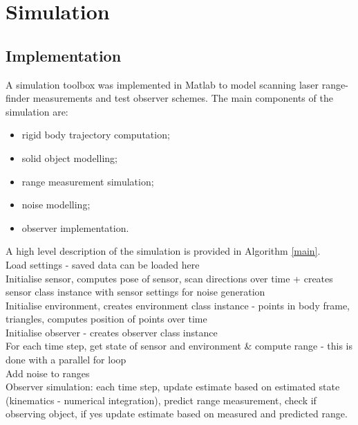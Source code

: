 \chapter{Simulation}
\section{Implementation}
A simulation toolbox was implemented in Matlab to model scanning laser range-finder measurements and test observer schemes. The main components of the simulation are:
\begin{itemize}
\item rigid body trajectory computation;
\item solid object modelling;
\item range measurement simulation;
\item noise modelling;
\item observer implementation.
\end{itemize}

A high level description of the simulation is provided in Algorithm \ref{main}.\\
Load settings - saved data can be loaded here\\
Initialise sensor, computes pose of sensor, scan directions over time + creates sensor class instance with sensor settings for noise generation\\
Initialise environment, creates environment class instance - points in body frame, triangles, computes position of points over time\\
Initialise observer - creates observer class instance\\
For each time step, get state of sensor and environment \& compute range - this is done with a parallel for loop\\
Add noise to ranges\\
Observer simulation: each time step, update estimate based on estimated state (kinematics - numerical integration), predict range measurement, check if observing object, if yes update estimate  based on measured and predicted range.

